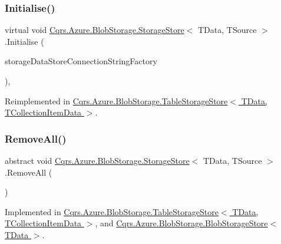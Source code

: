 \subsubsection{\texorpdfstring{Initialise()}{Initialise()}}
{\footnotesize\ttfamily virtual void \hyperlink{classCqrs_1_1Azure_1_1BlobStorage_1_1StorageStore}{Cqrs.\+Azure.\+Blob\+Storage.\+Storage\+Store}$<$ T\+Data, T\+Source $>$.Initialise (\begin{DoxyParamCaption}\item[{\hyperlink{interfaceCqrs_1_1Azure_1_1BlobStorage_1_1IStorageStoreConnectionStringFactory}{I\+Storage\+Store\+Connection\+String\+Factory}}]{storage\+Data\+Store\+Connection\+String\+Factory }\end{DoxyParamCaption})\hspace{0.3cm}{\ttfamily [protected]}, {\ttfamily [virtual]}}



Reimplemented in \hyperlink{classCqrs_1_1Azure_1_1BlobStorage_1_1TableStorageStore_ae775f039a168cc48c731314c7e494bb6}{Cqrs.\+Azure.\+Blob\+Storage.\+Table\+Storage\+Store$<$ T\+Data, T\+Collection\+Item\+Data $>$}.

\mbox{\label{classCqrs_1_1Azure_1_1BlobStorage_1_1StorageStore_a4e848f342be903293812b3b660464d1a}} 
\subsubsection{\texorpdfstring{Remove\+All()}{RemoveAll()}}
{\footnotesize\ttfamily abstract void \hyperlink{classCqrs_1_1Azure_1_1BlobStorage_1_1StorageStore}{Cqrs.\+Azure.\+Blob\+Storage.\+Storage\+Store}$<$ T\+Data, T\+Source $>$.Remove\+All (\begin{DoxyParamCaption}{ }\end{DoxyParamCaption})\hspace{0.3cm}{\ttfamily [pure virtual]}}



Implemented in \hyperlink{classCqrs_1_1Azure_1_1BlobStorage_1_1TableStorageStore_aadd66b35bfa105ef4446bd791e99a3d5}{Cqrs.\+Azure.\+Blob\+Storage.\+Table\+Storage\+Store$<$ T\+Data, T\+Collection\+Item\+Data $>$}, and \hyperlink{classCqrs_1_1Azure_1_1BlobStorage_1_1BlobStorageStore_a4371b95250e51b8462d8ab33b6f3fe9e}{Cqrs.\+Azure.\+Blob\+Storage.\+Blob\+Storage\+Store$<$ T\+Data $>$}.

